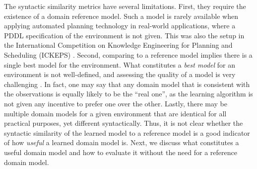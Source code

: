 \documentclass[letterpaper]{article} %
\newif\ifaddcomments
\newcommand{\roni}[1]{\ifaddcomments{\textcolor{red}{[Roni: #1]}}\fi}
\newcommand{\gregor}[1]{\ifaddcomments{\textcolor{orange}{[Gregor: #1]}}\fi}
\begin{document}
The syntactic similarity metrics have several limitations. 
First, they require the existence of a domain reference model. 
Such a model is rarely available when applying automated planning technology in real-world applications, where a PDDL specification of the environment is not given. 
This was also the setup in the International Competition on Knowledge Engineering for Planning and Scheduling (ICKEPS) \citep{DBLP:journals/aim/ChrpaMVV17}. 
Second, comparing to a reference model implies there is a single best model for the environment. 
What constitutes a \emph{best model} for an environment is not well-defined, and assessing the quality of a model is very challenging \citep{DBLP:conf/kcap/McCluskeyVV17}. 
In fact, one may say that any domain model that is consistent with the observations is equally likely to be the ``real one'', as the learning algorithm is not given any incentive to prefer one over the other. 
Lastly, there may be multiple domain models for a given environment that are identical for all practical purposes, yet different syntactically. 
Thus, it is not clear whether the syntactic similarity of the learned model to a reference model is a good indicator of how \emph{useful} a learned domain model is. 
Next, we discuss what constitutes a useful domain model and how to evaluate it without the need for a reference domain model.


\end{document}
